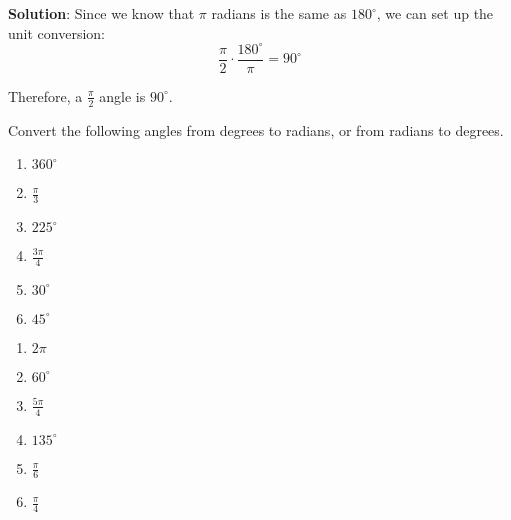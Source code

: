 \textbf{Solution}: Since we know that $\pi$ radians is the same as $180^\circ$,
we can set up the unit conversion:
$$\frac{\pi}{2} \cdot \frac{180^\circ}{\pi} = 90^\circ$$

Therefore, a $\frac{\pi}{2}$ angle is $90^\circ$. 


\begin{Exercise}[label = radians]
Convert the following angles from degrees to radians, or from radians to degrees. 
\begin{enumerate}
\item $360^\circ$
\item $\frac{\pi}{3}$
\item $225^\circ$
\item $\frac{3\pi}{4}$
\item $30^\circ$
\item $45^\circ$
\end{enumerate}
\end{Exercise}

\begin{Answer}[ref = radians]
\begin{enumerate}
\item $2\pi$
\item $60^\circ$
\item $\frac{5\pi}{4}$
\item $135^\circ$
\item $\frac{\pi}{6}$
\item $\frac{\pi}{4}$
\end{enumerate}
\end{Answer}



